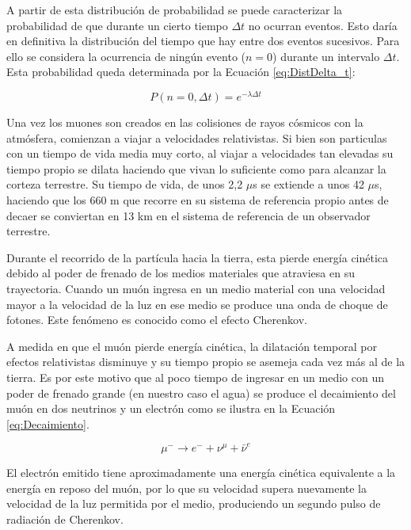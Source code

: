 \documentclass[twocolumn , reprint, a4paper, 12pt]{article}
\begin{document}
A partir de esta distribución de probabilidad se puede caracterizar la probabilidad de que durante un cierto tiempo $\Delta t$ 
no ocurran eventos. Esto daría en definitiva la distribución del tiempo que hay entre dos eventos sucesivos.
Para ello se considera la ocurrencia de ningún evento ($n = 0$) durante un intervalo $\Delta t$. Esta probabilidad queda
determinada por la Ecuación \ref{eq:DistDelta_t}:

\begin{equation}
    \label{eq:DistDelta_t}
    P(n = 0 , \Delta t) = e^{-\lambda \Delta t}
\end{equation}

Una vez los muones son creados en las colisiones de rayos cósmicos con la atmósfera, comienzan a viajar a velocidades relativistas.
Si bien son particulas con un tiempo de vida media muy corto, al viajar a velocidades tan elevadas su tiempo propio se dilata haciendo que vivan
lo suficiente como para alcanzar la corteza terrestre. Su tiempo de vida, de unos 2,2 $\mu$s se extiende a unos 42 $\mu$s, haciendo que los
660 m que recorre en su sistema de referencia propio antes de decaer se conviertan en 13 km en el sistema de referencia de un observador terrestre.
\cite{Auger}

Durante el recorrido de la partícula hacia la tierra, esta pierde energía cinética 
debido al poder de frenado de los medios materiales que atraviesa en su trayectoria.
Cuando un muón ingresa en un medio material con una velocidad mayor a la velocidad de la luz en ese medio
se produce una onda de choque de fotones. Este fenómeno es conocido como el efecto Cherenkov.

A medida en que el muón pierde energía cinética, la dilatación temporal por efectos 
relativistas disminuye y su tiempo propio se asemeja cada vez más al de la tierra. 
Es por este motivo que al poco tiempo de ingresar en un medio con un poder de frenado 
grande (en nuestro caso el agua) se produce el decaimiento del muón en dos neutrinos y un electrón
como se ilustra en la Ecuación \ref{eq:Decaimiento}.

\begin{equation}
    \label{eq:Decaimiento}
    \mu^{-} \longrightarrow e^{-} + \nu^{\mu} + \bar{\nu}^{e}
\end{equation}

El electrón emitido tiene aproximadamente una energía cinética equivalente a la energía 
en reposo del muón, por lo que su velocidad supera nuevamente la velocidad de la luz 
permitida por el medio, produciendo un segundo pulso de radiación de Cherenkov. 
\end{document}

